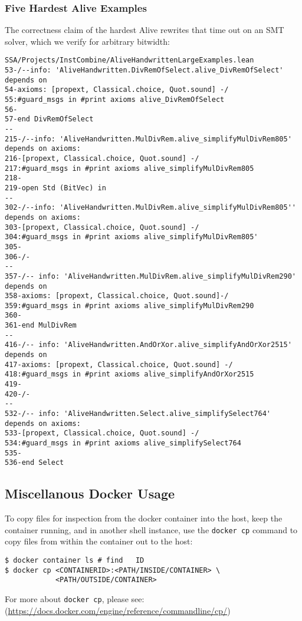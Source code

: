 \documentclass{sigplanconf}
\begin{document}
\subsubsection{Five Hardest Alive Examples}

The correctness claim of the hardest Alive rewrites that time out on an SMT solver, which we verify 
for arbitrary bitwidth:

\begin{verbatim}
SSA/Projects/InstCombine/AliveHandwrittenLargeExamples.lean
53-/--info: 'AliveHandwritten.DivRemOfSelect.alive_DivRemOfSelect' depends on
54-axioms: [propext, Classical.choice, Quot.sound] -/
55:#guard_msgs in #print axioms alive_DivRemOfSelect
56-
57-end DivRemOfSelect
--
215-/--info: 'AliveHandwritten.MulDivRem.alive_simplifyMulDivRem805' depends on axioms:
216-[propext, Classical.choice, Quot.sound] -/
217:#guard_msgs in #print axioms alive_simplifyMulDivRem805
218-
219-open Std (BitVec) in
--
302-/--info: 'AliveHandwritten.MulDivRem.alive_simplifyMulDivRem805'' depends on axioms:
303-[propext, Classical.choice, Quot.sound] -/
304:#guard_msgs in #print axioms alive_simplifyMulDivRem805'
305-
306-/-
--
357-/-- info: 'AliveHandwritten.MulDivRem.alive_simplifyMulDivRem290' depends on
358-axioms: [propext, Classical.choice, Quot.sound]-/
359:#guard_msgs in #print axioms alive_simplifyMulDivRem290
360-
361-end MulDivRem
--
416-/-- info: 'AliveHandwritten.AndOrXor.alive_simplifyAndOrXor2515' depends on
417-axioms: [propext, Classical.choice, Quot.sound] -/
418:#guard_msgs in #print axioms alive_simplifyAndOrXor2515
419-
420-/-
--
532-/-- info: 'AliveHandwritten.Select.alive_simplifySelect764' depends on axioms:
533-[propext, Classical.choice, Quot.sound] -/
534:#guard_msgs in #print axioms alive_simplifySelect764
535-
536-end Select
\end{verbatim}

\subsection{Miscellanous Docker Usage}

To copy files for inspection from the docker container into the host,
 keep the container running, and in another
shell instance, use the \texttt{docker cp}
command to copy files from within the container out to the host:

\begin{verbatim}
$ docker container ls # find   ID
$ docker cp <CONTAINERID>:<PATH/INSIDE/CONTAINER> \
            <PATH/OUTSIDE/CONTAINER>
\end{verbatim}
For more about \texttt{docker cp}, please see:
(\url{https://docs.docker.com/engine/reference/commandline/cp/})





\end{document}
